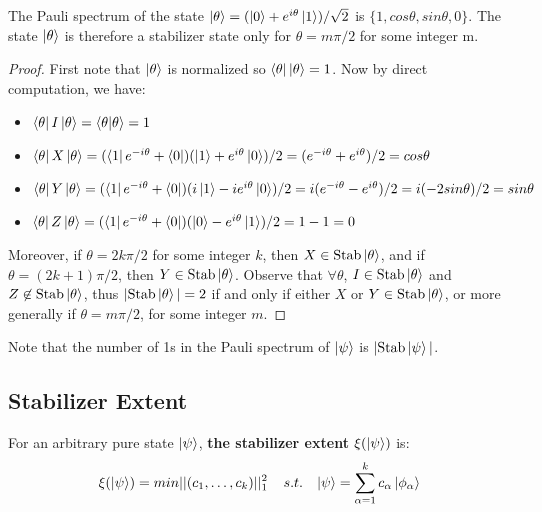 \documentclass[12pt]{dalthesis}
\begin{document}
\begin{proposition}
The Pauli spectrum of the state $\ket{\theta} = (\ket{0} + e^{i\theta}\ket{1})/\sqrt{2}$ is $\{1, cos\theta, sin\theta, 0\}$. The state $\ket{\theta}$ is therefore a stabilizer state only for $\theta = m \pi/2$ for some integer m.
\end{proposition}
\begin{proof}
First note that $\ket{\theta}$ is normalized so $\bra{\theta}\ket{\theta} = 1$. Now by direct computation, we have:
\begin{itemize}
\item $\bra{\theta}I\ket{\theta} = \braket{\theta|\theta} = 1$
\item $\bra{\theta}X\ket{\theta} = (\bra{1}e^{-i\theta} + \bra{0})(\ket{1} + e^{i\theta}\ket{0})/2 = (e^{-i\theta} + e^{i\theta})/2 = cos\theta$
\item $\bra{\theta}Y\ket{\theta} = (\bra{1}e^{-i\theta} + \bra{0})(i\ket{1} - ie^{i\theta}\ket{0})/2 = i(e^{-i\theta} - e^{i\theta})/2 = i(-2sin\theta)/2 = sin\theta$
\item $\bra{\theta}Z\ket{\theta} = (\bra{1}e^{-i\theta} + \bra{0})(\ket{0} - e^{i\theta}\ket{1})/2 = 1 - 1 = 0$
\end{itemize} 
Moreover, if $\theta = 2k\pi /2$ for some integer $k$, then $X \in \text{Stab}\ket{\theta}$, and if $\theta = (2k+1)\pi /2$, then $Y \in \text{Stab}\ket{\theta}$. Observe that $\forall \theta$, $I \in \text{Stab}\ket{\theta}$ and $Z \not\in \text{Stab}\ket{\theta}$, thus $|\text{Stab}\ket{\theta}| = 2$ if and only if either $X$ or $Y \in \text{Stab}\ket{\theta}$, or more generally if $\theta = m \pi /2$, for some integer $m$.
\end{proof}
Note that the number of 1s in the Pauli spectrum of $\ket{\psi}$ is $|\text{Stab}\ket{\psi}|$.

\subsection{Stabilizer Extent}
\begin{definition}
For an arbitrary pure state $\ket{\psi}$, \textbf{the stabilizer extent} $\xi (\ket{\psi})$ is:
\begin{equation}
\xi (\ket{\psi}) = min||(c_1, \dots , c_k)||_1^2 \hspace{4mm} s.t. \hspace{3mm} \ket{\psi} = \sum_{\alpha = 1}^k c_{\alpha} \ket{\phi_{\alpha}}
\end{equation}
\end{definition}
\end{document}
